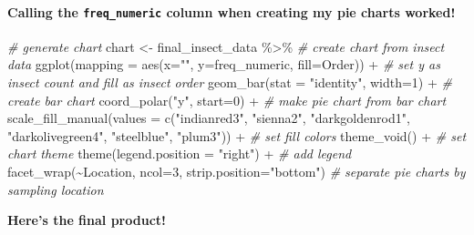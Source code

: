 \documentclass[
]{article}
\newenvironment{Shaded}{\begin{snugshade}}{\end{snugshade}}
\newcommand{\AttributeTok}[1]{\textcolor[rgb]{0.77,0.63,0.00}{#1}}
\newcommand{\CommentTok}[1]{\textcolor[rgb]{0.56,0.35,0.01}{\textit{#1}}}
\newcommand{\DecValTok}[1]{\textcolor[rgb]{0.00,0.00,0.81}{#1}}
\newcommand{\FunctionTok}[1]{\textcolor[rgb]{0.00,0.00,0.00}{#1}}
\newcommand{\NormalTok}[1]{#1}
\newcommand{\OtherTok}[1]{\textcolor[rgb]{0.56,0.35,0.01}{#1}}
\newcommand{\SpecialCharTok}[1]{\textcolor[rgb]{0.00,0.00,0.00}{#1}}
\newcommand{\StringTok}[1]{\textcolor[rgb]{0.31,0.60,0.02}{#1}}
\begin{document}
\hypertarget{calling-the-freq_numeric-column-when-creating-my-pie-charts-worked}{%
\paragraph{\texorpdfstring{Calling the \texttt{freq\_numeric} column
when creating my pie charts
worked!}{Calling the freq\_numeric column when creating my pie charts worked!}}\label{calling-the-freq_numeric-column-when-creating-my-pie-charts-worked}}

\begin{Shaded}
\begin{Highlighting}[]
\CommentTok{\# generate chart}
\NormalTok{chart }\OtherTok{\textless{}{-}}\NormalTok{ final\_insect\_data }\SpecialCharTok{\%\textgreater{}\%}  \CommentTok{\# create chart from insect data}
  \FunctionTok{ggplot}\NormalTok{(}\AttributeTok{mapping =} \FunctionTok{aes}\NormalTok{(}\AttributeTok{x=}\StringTok{""}\NormalTok{, }\AttributeTok{y=}\NormalTok{freq\_numeric, }\AttributeTok{fill=}\NormalTok{Order)) }\SpecialCharTok{+}  \CommentTok{\# set y as insect count and fill as insect order}
  \FunctionTok{geom\_bar}\NormalTok{(}\AttributeTok{stat =} \StringTok{"identity"}\NormalTok{, }\AttributeTok{width=}\DecValTok{1}\NormalTok{) }\SpecialCharTok{+}  \CommentTok{\# create bar chart}
  \FunctionTok{coord\_polar}\NormalTok{(}\StringTok{"y"}\NormalTok{, }\AttributeTok{start=}\DecValTok{0}\NormalTok{) }\SpecialCharTok{+}  \CommentTok{\# make pie chart from bar chart}
  \FunctionTok{scale\_fill\_manual}\NormalTok{(}\AttributeTok{values =} \FunctionTok{c}\NormalTok{(}\StringTok{"indianred3"}\NormalTok{, }\StringTok{"sienna2"}\NormalTok{, }\StringTok{"darkgoldenrod1"}\NormalTok{, }\StringTok{"darkolivegreen4"}\NormalTok{, }\StringTok{"steelblue"}\NormalTok{, }\StringTok{"plum3"}\NormalTok{)) }\SpecialCharTok{+}  \CommentTok{\# set fill colors}
  \FunctionTok{theme\_void}\NormalTok{() }\SpecialCharTok{+}  \CommentTok{\# set chart theme}
  \FunctionTok{theme}\NormalTok{(}\AttributeTok{legend.position =} \StringTok{"right"}\NormalTok{) }\SpecialCharTok{+}  \CommentTok{\# add legend}
  \FunctionTok{facet\_wrap}\NormalTok{(}\SpecialCharTok{\textasciitilde{}}\NormalTok{Location, }\AttributeTok{ncol=}\DecValTok{3}\NormalTok{, }\AttributeTok{strip.position=}\StringTok{"bottom"}\NormalTok{)  }\CommentTok{\# separate pie charts by sampling location}
\end{Highlighting}
\end{Shaded}

\textbf{Here's the final product!}
\end{document}
